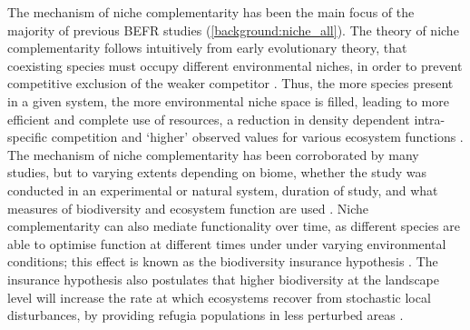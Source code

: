 \begin{refsection}
The mechanism of niche complementarity has been the main focus of the majority of previous BEFR studies \citep{Wright2017} (\autoref{background:niche_all}). The theory of niche complementarity follows intuitively from early evolutionary theory, that coexisting species must occupy different environmental niches, in order to prevent competitive exclusion of the weaker competitor \citep{Tobner2016, Levine2009, MacArthur1955, MacArthur1967}. Thus, the more species present in a given system, the more environmental niche space is filled, leading to more efficient and complete use of resources, a reduction in density dependent intra-specific competition and `higher' observed values for various ecosystem functions \citep{Isbell2013}. The mechanism of niche complementarity has been corroborated by many studies, but to varying extents depending on biome, whether the study was conducted in an experimental or natural system, duration of study, and what measures of biodiversity and ecosystem function are used \citep{Wright2017, Cardinale2009, Cardinale2011}. Niche complementarity can also mediate functionality over time, as different species are able to optimise function at different times under under varying environmental conditions; this effect is known as the biodiversity insurance hypothesis \citep{Morin2014b, Bartomeus2013, Yachi1999a}. The insurance hypothesis also postulates that higher biodiversity at the landscape level will increase the rate at which ecosystems recover from stochastic local disturbances, by providing refugia populations in less perturbed areas \citep{Gonzalez2009}. 


\end{refsection}
